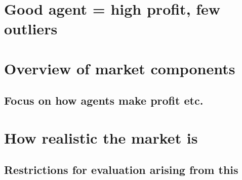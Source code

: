 \section{Good agent = high profit, few outliers}
\section{Overview of market components}
\subsection{Focus on how agents make profit etc.}
\section{How realistic the market is}
\subsection{Restrictions for evaluation arising from this}